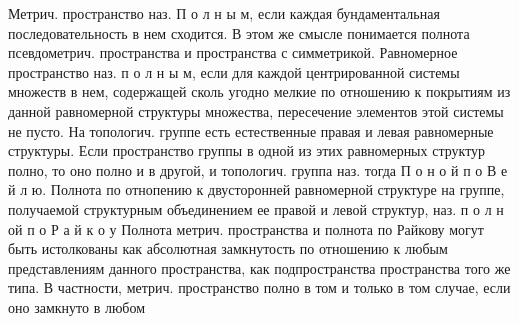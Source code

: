 \documentclass[10pt]{article}
\begin{document}
Метрич. пространство наз. П о л н ы м, если каждая бундаментальная последовательность в нем сходится. В этом же смысле понимается полнота псевдометрич. пространства и пространства с симметрикой. Равномерное пространство наз. п о л н ы м, если для каждой центрированной системы множеств в нем, содержащей сколь угодно мелкие по отношению к покрытиям из данной равномерной структуры множества, пересечение элементов этой системы не пусто. На топологич. группе есть естественные правая и левая равномерные структуры. Если пространство группы в одной из этих равномерных структур полно, то оно полно и в другой, и топологич. группа наз. тогда П о н о й п $о$ В е й л ю. Полнота по отнопению к двусторонней равномерной структуре на группе, получаемой структурным объединением ее правой и левой структур, наз. п о л н ой п о Р а й к о у Полнота метрич. пространства и полнота по Райкову могут быть истолкованы как абсолютная замкнутость по отношению к любым представлениям данного пространства, как подпространства пространства того же типа. В частности, метрич. пространство полно в том и только в том случае, если оно замкнуто в любом
\end{document}

